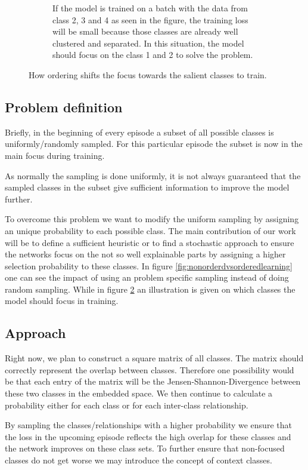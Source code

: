 \begin{figure}
\begin{subfigure}{0.5\textwidth}
		\caption{If the model is trained on a batch with the data from class 2, 3 and 4 as seen in the figure, the training loss will be small because those classes are already well clustered and separated. In this situation, the model should focus on the class 1 and 2 to solve the problem.}
		\label{fig:optimizingoverlappingclasses}
	\end{subfigure}
	\caption{How ordering shifts the focus towards the salient classes to train.}
\end{figure}

\subsection{Problem definition}
Briefly, in the beginning of every episode a subset of all possible classes is uniformly/randomly sampled. For this particular episode the subset is now in the main focus during training.

As normally the sampling is done uniformly, it is not always guaranteed that the sampled classes in the subset give sufficient information to improve the model further. 

To overcome this problem we want to modify the uniform sampling by assigning an unique probability to each possible class. The main contribution of our work will be to define a sufficient heuristic or to find a stochastic approach to ensure the networks focus on the not so well explainable parts by assigning a higher selection probability to these classes.
In figure \ref{fig:nonorderdvsorderedlearning} one can see the impact of using an problem specific sampling instead of doing random sampling. While in figure \ref{fig:optimizingoverlappingclasses} an illustration is given on which classes the model should focus in training.

\subsection{Approach}
Right now, we plan to construct a square matrix of all classes. The matrix should correctly represent the overlap between classes. Therefore one possibility would be that each entry of the matrix will be the Jensen-Shannon-Divergence between these two classes in the embedded space. We then continue to calculate a probability either for each class or for each inter-class relationship.

By sampling the classes/relationships with a higher probability we ensure that the loss in the upcoming episode reflects the high overlap for these classes and the network improves on these class sets. To further ensure that non-focused classes do not get worse we may introduce the concept of context classes.

